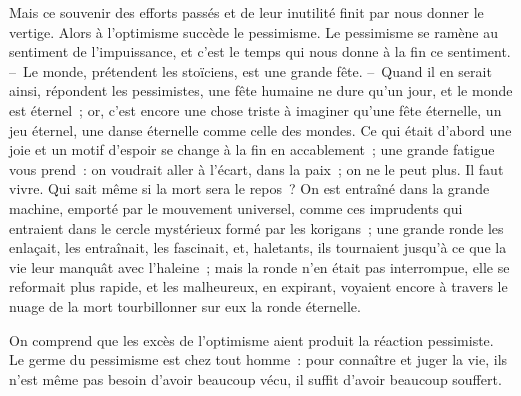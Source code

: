 \documentclass[french,twoside]{book} %
\begin{document}
Mais ce souvenir des efforts passés et de leur inutilité finit par nous donner le vertige. Alors à l’optimisme succède le pessimisme. Le pessimisme se ramène au sentiment de l’impuissance, et c’est le temps qui nous donne à la fin ce sentiment. – Le monde, prétendent les stoïciens, est une grande fête. – Quand il en serait ainsi, répondent les pessimistes, une fête humaine ne dure qu’un jour, et le monde est éternel ; or, c’est encore une chose triste à imaginer qu’une fête éternelle, un jeu éternel, une danse éternelle comme celle des mondes. Ce qui était d’abord une joie et un motif d’espoir se change à la fin en accablement ; une grande fatigue vous prend : on voudrait aller à l’écart, dans la paix ; on ne le peut plus. Il faut vivre. Qui sait même si la mort sera le repos ? On est entraîné dans la grande machine, emporté par le mouvement universel, comme ces imprudents qui entraient dans le cercle mystérieux formé par les korigans ; une grande ronde les enlaçait, les entraînait, les fascinait, et, haletants, ils tournaient jusqu’à ce que la vie leur manquât avec l’haleine ; mais la ronde n’en était pas interrompue, elle se reformait plus rapide, et les malheureux, en expirant, voyaient encore à travers le nuage de la mort tourbillonner sur eux la ronde éternelle.\par
On comprend que les excès de l’optimisme aient produit la réaction pessimiste. Le germe du pessimisme est chez tout homme : pour connaître et juger la vie, ils n’est même pas besoin d’avoir beaucoup vécu, il suffit d’avoir beaucoup souffert.
\end{document}
